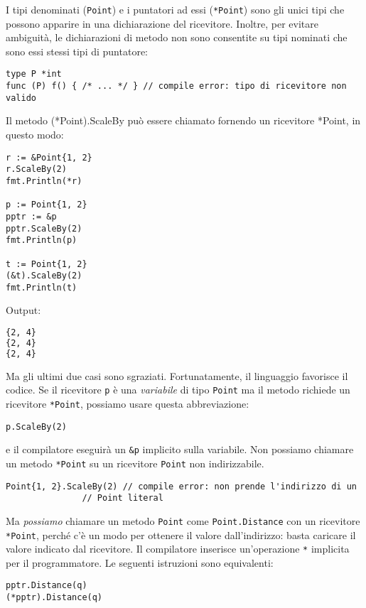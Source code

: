 \documentclass[../../thesis.tex]{subfiles}
\begin{document}
    I tipi denominati (\verb"Point") e i puntatori ad essi (\verb"*Point") sono gli unici tipi che possono apparire in una dichiarazione del ricevitore.
    Inoltre, per evitare ambiguità, le dichiarazioni di metodo non sono consentite su tipi nominati che sono essi stessi tipi di puntatore:
    \begin{lstlisting}[frame = single,label={lst:lstlisting5-2.2}]
type P *int
func (P) f() { /* ... */ } // compile error: tipo di ricevitore non valido
    \end{lstlisting}
    Il metodo (*Point).ScaleBy può essere chiamato fornendo un ricevitore *Point, in questo modo:
    \begin{lstlisting}[frame = single,label={lst:lstlisting5-2.3}]
r := &Point{1, 2}
r.ScaleBy(2)
fmt.Println(*r)

p := Point{1, 2}
pptr := &p
pptr.ScaleBy(2)
fmt.Println(p)

t := Point{1, 2}
(&t).ScaleBy(2)
fmt.Println(t)
    \end{lstlisting}
    Output:
    \begin{lstlisting}[language = bash, frame = L,label={lst:lstlisting5-2.4}]
{2, 4}
{2, 4}
{2, 4}
    \end{lstlisting}
    Ma gli ultimi due casi sono sgraziati.
    Fortunatamente, il linguaggio favorisce il codice.
    Se il ricevitore \verb"p" è una \textit{variabile} di tipo \verb"Point" ma il metodo richiede un ricevitore \verb"*Point", possiamo usare questa abbreviazione:
    \begin{lstlisting}[frame = single,label={lst:lstlisting5-2.5}]
p.ScaleBy(2)
    \end{lstlisting}
    e il compilatore eseguirà un \verb"&p" implicito sulla variabile.
    Non possiamo chiamare un metodo \verb"*Point" su un ricevitore \verb"Point" non indirizzabile.
    \begin{lstlisting}[frame = single,label={lst:lstlisting5-2.6}]
Point{1, 2}.ScaleBy(2) // compile error: non prende l'indirizzo di un
		       // Point literal
    \end{lstlisting}
    Ma \textit{possiamo} chiamare un metodo \verb"Point" come \verb"Point.Distance" con un ricevitore \verb"*Point", perché c'è un modo per ottenere il valore dall'indirizzo: basta caricare il valore indicato dal ricevitore.
    Il compilatore inserisce un'operazione \verb"*" implicita per il programmatore.
    Le seguenti istruzioni sono equivalenti:
    \begin{lstlisting}[frame = single,label={lst:lstlisting5-2.7}]
pptr.Distance(q)
(*pptr).Distance(q)
    \end{lstlisting}
\end{document}
